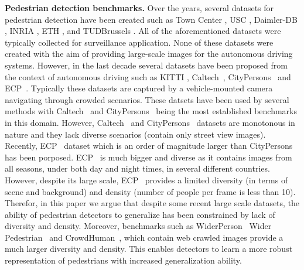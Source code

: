 \documentclass[final]{cvpr}
\newcommand{\caltech}[1]{{Caltech~\cite{dollar2012pedestrian}}}
\newcommand{\cityperson}[1]{{CityPersons~\cite{zhang2017citypersons}}}
\newcommand{\ecp}[1]{{ECP~\cite{braun2018eurocity}}}
\newcommand{\widerperson}[1]{{Wider Pedestrian~\cite{zhang2019widerperson}}}
\newcommand{\crowdhuman}[1]{{CrowdHuman~\cite{shao2018crowdhuman}}}
\begin{document}
\iffalse
Occlusion stands as one of the major problems in pedestrian detection. 
In the past, engineered selection of human parts were used to reason over, in order to handle occlusion \cite{wu2005detection,shet2007bilattice,enzweiler2010multi,duan2010structura,ouyang2012discriminative,tian2015deep,ouyang2013joint,zhou2016learning,zhou2017multi,noh2018improving,zhoudiscriminative,mathias2013handling,chu2013tracking,lee2014driving}. 
Since, the selection of human parts were hand-crafted, this resulted in limited generalization ability of these approaches. Recently, Bi-Box regression \cite{zhou2018bi}, extended the architecture of Faster R-CNN by adding an occlusion branch, which learnt features only for visible part of a pedestrian.  Another work \cite{lin2018graininess}, addressed occlusion handling by incorporating extra fine-grained information into low resolution feature maps to make it more robust to occlusion. An occlusion-aware R-CNN is proposed in \cite{zhang2018occlusion}, they proposed an aggregation loss and part occlusion aware region of interest pooling to mitigate the affect of occlusion by including prior structure information of human body. 
\fi


\noindent\textbf{Pedestrian detection benchmarks.}
Over the years, several datasets for pedestrian detection have been created such as Town Center \cite{benfold2011stable}, USC \cite{wu2007cluster}, Daimler-DB \cite{munder2006experimental}, INRIA \cite{dalal2005histograms}, ETH \cite{ess2007depth}, and TUDBrussels \cite{wojek2009multi}. 
All of the aforementioned datasets were typically collected for surveillance application. 
None of these datasets were created with the aim of providing large-scale images for the autonomous driving systems. 
However, in the last decade several datasets have been proposed from the context of autonomous driving such as KITTI \cite{geiger2012we}, \caltech{}, \cityperson{} and \ecp{}. Typically these datasets are captured by a vehicle-mounted camera navigating through crowded scenarios. 
These datsets have been used by several methods with \caltech{} and \cityperson{} being the most established benchmarks in this domain. 
However, \caltech{} and \cityperson{} datasets are monotonous in nature and they lack diverse scenarios (contain only street view images). 
Recently, \ecp{} dataset which is an order of magnitude larger than \cityperson{} has been porposed. 
\ecp{} is much bigger and diverse as it contains images from all seasons, under both day and night times, in several different countries. 
However, despite its large scale, \ecp{} provides a limited diversity (in terms of scene and background) and density (number of people per frame is less than 10). 
Therefor, in this paper we argue that despite some recent large scale datasets, the ability of pedestrian detectors to generalize has been constrained by lack of diversity and density. 
Moreover, benchmarks such as WiderPerson~\cite{zhang2019widerpersondataset} \widerperson{} and \crowdhuman{}, which contain web crawled images provide a much larger diversity and density. 
This enables detectors to learn a more robust representation of pedestrians with increased generalization ability. 
\end{document}

